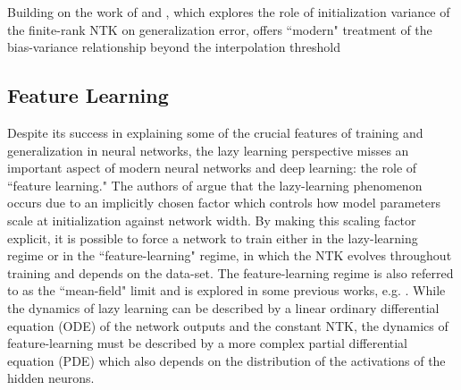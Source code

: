 \documentclass[a4paper, 12pt]{article}
\begin{document}
Building on the work of \cite{meiGeneralizationErrorRandom2019} and \cite{ geigerScalingDescriptionGeneralization2019}, which explores the role of initialization variance of the finite-rank NTK on generalization error, \cite{dascoliDoubleTroubleDouble2020} offers  ``modern" treatment of the bias-variance relationship beyond the interpolation threshold

\subsection{Feature Learning}

Despite its success in explaining some of the crucial features of training and generalization in neural networks, the lazy learning perspective misses an important aspect of modern neural networks and deep learning: the role of ``feature learning."  The authors of \cite{chizatLazyTrainingDifferentiable2020} argue that the lazy-learning phenomenon occurs due to an implicitly chosen factor which controls how model parameters scale at initialization against network width. By making this scaling factor explicit, it is possible to force a network to train either in the lazy-learning regime or in the ``feature-learning" regime, in which the NTK evolves throughout training and depends on the data-set. The feature-learning regime is also referred to as the ``mean-field" limit and is explored in some previous works, e.g. \cite{meiMeanFieldView2018}. While the dynamics of lazy learning can be described by a linear ordinary differential equation (ODE) of the network outputs and the constant NTK, the dynamics of feature-learning must be described by a more complex partial differential equation (PDE) which also depends on the distribution of the activations of the hidden neurons.\\
\end{document}
